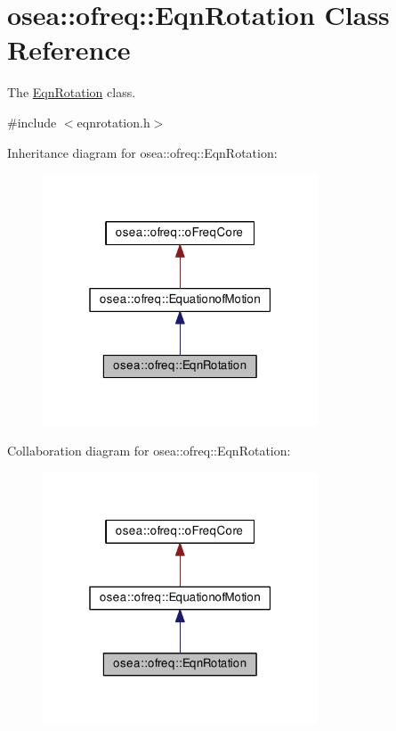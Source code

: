 \hypertarget{classosea_1_1ofreq_1_1_eqn_rotation}{\section{osea\-:\-:ofreq\-:\-:Eqn\-Rotation Class Reference}
\label{classosea_1_1ofreq_1_1_eqn_rotation}
}


The \hyperlink{classosea_1_1ofreq_1_1_eqn_rotation}{Eqn\-Rotation} class.  




{\ttfamily \#include $<$eqnrotation.\-h$>$}



Inheritance diagram for osea\-:\-:ofreq\-:\-:Eqn\-Rotation\-:
\nopagebreak
\begin{figure}[H]
\begin{center}
\leavevmode
\includegraphics[width=232pt]{classosea_1_1ofreq_1_1_eqn_rotation__inherit__graph}
\end{center}
\end{figure}


Collaboration diagram for osea\-:\-:ofreq\-:\-:Eqn\-Rotation\-:
\nopagebreak
\begin{figure}[H]
\begin{center}
\leavevmode
\includegraphics[width=232pt]{classosea_1_1ofreq_1_1_eqn_rotation__coll__graph}
\end{center}
\end{figure}
